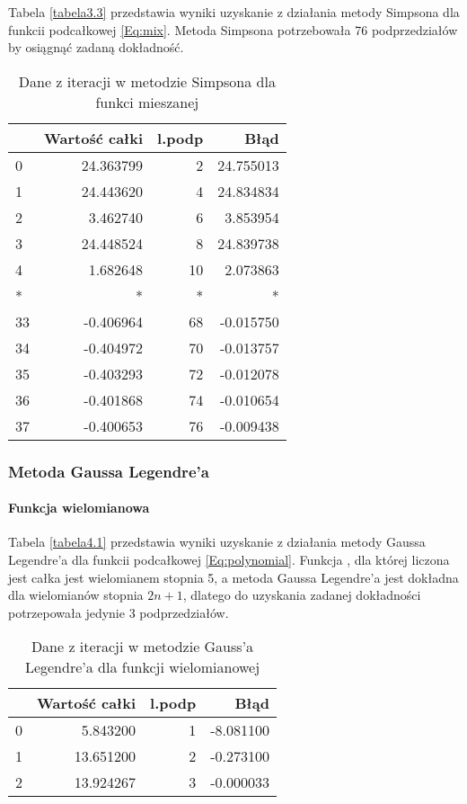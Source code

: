 \documentclass[12pt,twoside]{article}
\begin{document}
Tabela \eqref{tabela3.3} przedstawia wyniki uzyskanie z działania metody Simpsona dla funkcii podcałkowej \eqref{Eq:mix}. Metoda Simpsona potrzebowała 76 podprzedziałów by osiągnąć zadaną dokładność.

\begin{table}[H]
\centering
\caption{Dane z iteracji w metodzie Simpsona dla funkci mieszanej}
\label{tabela3.3}
\begin{tabular}{lrrr}
\toprule
{} &  Wartość całki &  l.podp &       Błąd \\
\midrule
0  &      24.363799 &       2 &  24.755013 \\
1  &      24.443620 &       4 &  24.834834 \\
2  &       3.462740 &       6 &   3.853954 \\
3  &      24.448524 &       8 &  24.839738 \\
4  &       1.682648 &      10 &   2.073863 \\
*   &       * &       * &   * \\
33 &      -0.406964 &      68 &  -0.015750 \\
34 &      -0.404972 &      70 &  -0.013757 \\
35 &      -0.403293 &      72 &  -0.012078 \\
36 &      -0.401868 &      74 &  -0.010654 \\
37 &      -0.400653 &      76 &  -0.009438 \\
\bottomrule
\end{tabular}

\end{table}


\subsubsection{Metoda Gaussa Legendre'a}

\paragraph{Funkcja wielomianowa}

Tabela \eqref{tabela4.1} przedstawia wyniki uzyskanie z działania metody Gaussa Legendre'a dla funkcii podcałkowej \eqref{Eq:polynomial}. Funkcja , dla której liczona jest całka jest wielomianem stopnia 5, a metoda Gaussa Legendre'a jest dokładna dla wielomianów stopnia $2n+1$, dlatego do uzyskania zadanej dokładności potrzepowała jedynie 3 podprzedziałów.

\begin{table}[H]
\centering 
\caption{Dane z iteracji w metodzie Gauss'a Legendre'a dla funkcji wielomianowej}
\label{tabela4.1}
\begin{tabular}{lrrr}
\toprule
{} &  Wartość całki &  l.podp &      Błąd \\
\midrule
0 &       5.843200 &       1 & -8.081100 \\
1 &      13.651200 &       2 & -0.273100 \\
2 &      13.924267 &       3 & -0.000033 \\
\bottomrule
\end{tabular}
\end{table}
\end{document}
